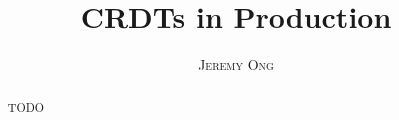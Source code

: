 \documentclass[twoside]{article}
\title{\vspace{-15mm}\fontsize{24pt}{10pt}\selectfont\textbf{CRDTs in Production}} %
\author{
\large
\textsc{Jeremy Ong}\\[2mm] %
\vspace{-5mm}
}
\date{}
\begin{document}
\maketitle %

\thispagestyle{fancy} %


\begin{abstract}

\noindent TODO

\end{abstract}

\end{document}
